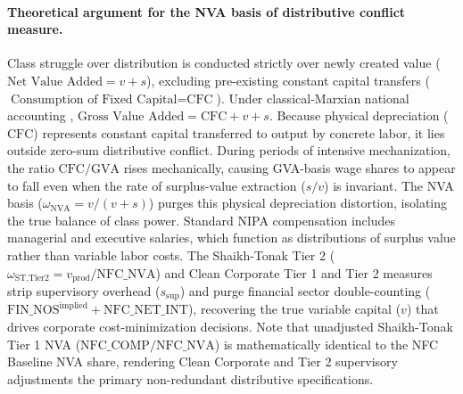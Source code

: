 \paragraph{Theoretical argument for the NVA basis of distributive conflict measure.}
Class struggle over distribution is conducted strictly over newly created value ($\text{Net Value Added} = v + s$), excluding pre-existing constant capital transfers ($\text{Consumption of Fixed Capital} = \text{CFC}$). Under classical-Marxian national accounting \citep{ShaikhTonak1994}, $\text{Gross Value Added} = \text{CFC} + v + s$. Because physical depreciation ($\text{CFC}$) represents constant capital transferred to output by concrete labor, it lies outside zero-sum distributive conflict. During periods of intensive mechanization, the ratio $\text{CFC}/\text{GVA}$ rises mechanically, causing GVA-basis wage shares to appear to fall even when the rate of surplus-value extraction ($s/v$) is invariant. The NVA basis ($\omega_{\text{NVA}} = v / (v + s)$) purges this physical depreciation distortion, isolating the true balance of class power. Standard NIPA compensation includes managerial and executive salaries, which function as distributions of surplus value rather than variable labor costs. The Shaikh-Tonak Tier 2 ($\omega_{\text{ST,Tier2}} = v_{\text{prod}} / \text{NFC\_NVA}$) and Clean Corporate Tier 1 and Tier 2 measures strip supervisory overhead ($s_{\text{sup}}$) and purge financial sector double-counting ($\text{FIN\_NOS}^{\text{implied}} + \text{NFC\_NET\_INT}$), recovering the true variable capital ($v$) that drives corporate cost-minimization decisions. Note that unadjusted Shaikh-Tonak Tier 1 NVA ($\text{NFC\_COMP} / \text{NFC\_NVA}$) is mathematically identical to the NFC Baseline NVA share, rendering Clean Corporate and Tier 2 supervisory adjustments the primary non-redundant distributive specifications.

